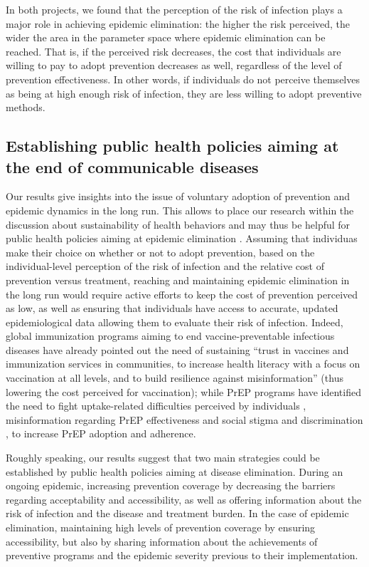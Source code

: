 In both projects, we found that the perception of the risk of infection plays a major role in achieving epidemic elimination: the higher the risk perceived, the wider the area in the parameter space where epidemic elimination can be reached. That is, if the perceived risk decreases, the cost that individuals are willing to pay to adopt prevention decreases as well, regardless of the level of prevention effectiveness. In other words, if individuals do not perceive themselves as being at high enough risk of infection, they are less willing to adopt preventive methods. 

\subsection{Establishing public health policies aiming at the end of communicable diseases}

Our results give insights into the issue of voluntary adoption of prevention and epidemic dynamics in the long run. This allows to place our research within the discussion about sustainability of health behaviors and may thus be helpful for public health policies aiming at epidemic elimination \cite[]{SDG_Goal3}. Assuming that individuas make their choice on whether or not to adopt prevention, based on the individual-level perception of the risk of infection and the relative cost of prevention versus treatment, reaching and maintaining epidemic elimination in the long run would require active efforts to keep the cost of prevention perceived as low, as well as ensuring that individuals have access to accurate, updated epidemiological data allowing them to evaluate their risk of infection. Indeed, global immunization programs aiming to end vaccine-preventable infectious diseases have already pointed out the need of sustaining ``trust in vaccines and immunization services in communities, to increase health literacy with a focus on vaccination at all levels, and to build resilience against misinformation'' \cite[]{WHO_IA2030} (thus lowering the cost perceived for vaccination); while PrEP programs have identified the need to fight uptake-related difficulties perceived by individuals \cite[]{Desai2018,Sidebottom2018}, misinformation regarding PrEP effectiveness \cite[]{Young2014,Underhill2016} and social stigma and discrimination \cite[]{Young2014,PerezFigueroa2015,Arnold2016}, to increase PrEP adoption and adherence.

Roughly speaking, our results suggest that two main strategies could be established by public health policies aiming at disease elimination. During an ongoing epidemic, increasing prevention coverage by decreasing the barriers regarding acceptability and accessibility, as well as offering information about the risk of infection and the disease and treatment burden. In the case of epidemic elimination, maintaining high levels of prevention coverage by ensuring accessibility, but also by sharing information about  the achievements of preventive programs and the epidemic severity previous to their implementation. 


